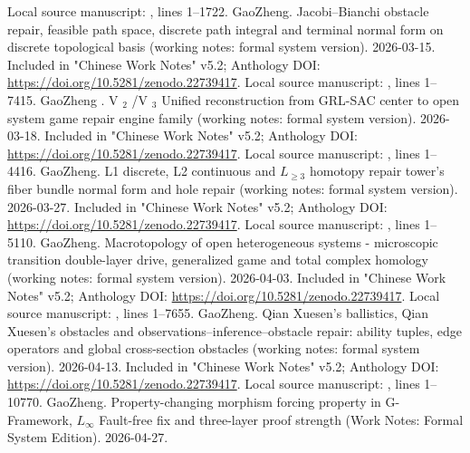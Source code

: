 \documentclass[11pt,a4paper]{article}
\theoremstyle{plain}
\theoremstyle{definition}
\theoremstyle{remark}
\begin{document}
\begin{CJK*}
\begin{thebibliography}
Local source manuscript: , lines 1--1722.  GaoZheng. Jacobi--Bianchi obstacle repair, feasible path space, discrete path integral and terminal normal form on discrete topological basis (working notes: formal system version). 2026-03-15.\newblock
Included in "Chinese Work Notes" v5.2; Anthology DOI: \url{https://doi.org/10.5281/zenodo.22739417}.\newblock
Local source manuscript: , lines 1--7415.  GaoZheng . V \(_2\) /V \(_3\) Unified reconstruction from GRL-SAC center to open system game repair engine family (working notes: formal system version). 2026-03-18.\newblock
Included in "Chinese Work Notes" v5.2; Anthology DOI: \url{https://doi.org/10.5281/zenodo.22739417}.\newblock
Local source manuscript: , lines 1--4416. 
GaoZheng. L1 discrete, L2 continuous and $L_{\ge 3}$ homotopy repair tower's fiber bundle normal form and hole repair (working notes: formal system version). 2026-03-27.\newblock
Included in "Chinese Work Notes" v5.2; Anthology DOI: \url{https://doi.org/10.5281/zenodo.22739417}.\newblock
Local source manuscript: , lines 1--5110.  GaoZheng. Macrotopology of open heterogeneous systems - microscopic transition double-layer drive, generalized game and total complex homology (working notes: formal system version). 2026-04-03.\newblock
Included in "Chinese Work Notes" v5.2; Anthology DOI: \url{https://doi.org/10.5281/zenodo.22739417}.\newblock
Local source manuscript: , lines 1--7655.  GaoZheng. Qian Xuesen's ballistics, Qian Xuesen's obstacles and observations--inference--obstacle repair: ability tuples, edge operators and global cross-section obstacles (working notes: formal system version). 2026-04-13.\newblock
Included in "Chinese Work Notes" v5.2; Anthology DOI: \url{https://doi.org/10.5281/zenodo.22739417}.\newblock
Local source manuscript: , lines 1--10770.  GaoZheng. Property-changing morphism forcing property in G-Framework, \texorpdfstring {$L_\infty$} {L-infinity} Fault-free fix and three-layer proof strength (Work Notes: Formal System Edition). 2026-04-27.\newblock

\end{thebibliography}
\end{CJK*}
\end{document}
